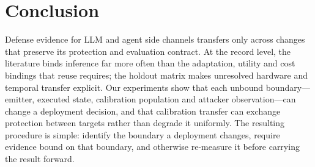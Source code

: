 \section{Conclusion}\label{sec:conclusion}
Defense evidence for LLM and agent side channels transfers only across changes that preserve its protection and evaluation contract. At the record level, the literature binds inference far more often than the adaptation, utility and cost bindings that reuse requires; the holdout matrix makes unresolved hardware and temporal transfer explicit. Our experiments show that each unbound boundary---emitter, executed state, calibration population and attacker observation---can change a deployment decision, and that calibration transfer can exchange protection between targets rather than degrade it uniformly. The resulting procedure is simple: identify the boundary a deployment changes, require evidence bound on that boundary, and otherwise re-measure it before carrying the result forward.
